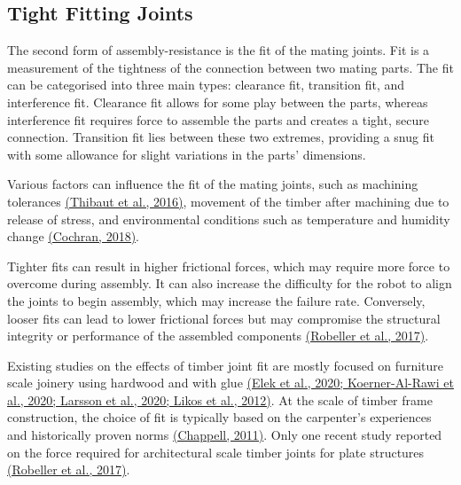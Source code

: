 \subsection{Tight Fitting Joints}

The second form of assembly-resistance is the fit of the mating joints. Fit is a measurement of the tightness of the connection between two mating parts. The fit can be categorised into three main types: clearance fit, transition fit, and interference fit. Clearance fit allows for some play between the parts, whereas interference fit requires force to assemble the parts and creates a tight, secure connection. Transition fit lies between these two extremes, providing a snug fit with some allowance for slight variations in the parts' dimensions.

Various factors can influence the fit of the mating joints, such as machining tolerances \href{https://www.zotero.org/google-docs/?FYX9pE}{(Thibaut et al., 2016)}, movement of the timber after machining due to release of stress, and environmental conditions such as temperature and humidity change \href{https://www.zotero.org/google-docs/?2HzXKN}{(Cochran, 2018)}. 

Tighter fits can result in higher frictional forces, which may require more force to overcome during assembly. It can also increase the difficulty for the robot to align the joints to begin assembly, which may increase the failure rate. Conversely, looser fits can lead to lower frictional forces but may compromise the structural integrity or performance of the assembled components \href{https://www.zotero.org/google-docs/?uzXtzz}{(Robeller et al., 2017)}.

Existing studies on the effects of timber joint fit are mostly focused on furniture scale joinery using hardwood and with glue \href{https://www.zotero.org/google-docs/?G6Rwhz}{(Elek et al., 2020; Koerner-Al-Rawi et al., 2020; Larsson et al., 2020; Likos et al., 2012)}. At the scale of timber frame construction, the choice of fit is typically based on the carpenter's experiences and historically proven norms \href{https://www.zotero.org/google-docs/?Gwwdvh}{(Chappell, 2011)}. Only one recent study reported on the force required for architectural scale timber joints for plate structures \href{https://www.zotero.org/google-docs/?saXZ5b}{(Robeller et al., 2017)}. 

